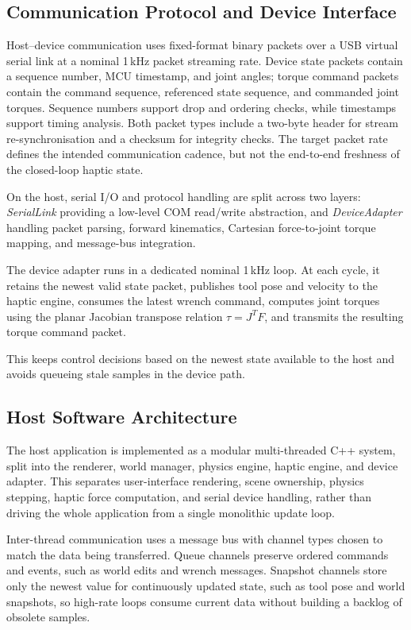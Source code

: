 \subsection{Communication Protocol and Device Interface}

Host--device communication uses fixed-format binary packets over a USB virtual serial link at a nominal 1\,kHz packet streaming rate. Device state packets contain a sequence number, MCU timestamp, and joint angles; torque command packets contain the command sequence, referenced state sequence, and commanded joint torques. Sequence numbers support drop and ordering checks, while timestamps support timing analysis. Both packet types include a two-byte header for stream re-synchronisation and a checksum for integrity checks. The target packet rate defines the intended communication cadence, but not the end-to-end freshness of the closed-loop haptic state.

On the host, serial I/O and protocol handling are split across two layers: \textit{SerialLink} providing a low-level COM read/write abstraction, and \textit{DeviceAdapter} handling packet parsing, forward kinematics, Cartesian force-to-joint torque mapping, and message-bus integration.

The device adapter runs in a dedicated nominal 1\,kHz loop. At each cycle, it retains the newest valid state packet, publishes tool pose and velocity to the haptic engine, consumes the latest wrench command, computes joint torques using the planar Jacobian transpose relation \(\tau = J^{T}F\), and transmits the resulting torque command packet.

This keeps control decisions based on the newest state available to the host and avoids queueing stale samples in the device path.

\subsection{Host Software Architecture}

The host application is implemented as a modular multi-threaded C++ system, split into the renderer, world manager, physics engine, haptic engine, and device adapter. This separates user-interface rendering, scene ownership, physics stepping, haptic force computation, and serial device handling, rather than driving the whole application from a single monolithic update loop.

Inter-thread communication uses a message bus with channel types chosen to match the data being transferred. Queue channels preserve ordered commands and events, such as world edits and wrench messages. Snapshot channels store only the newest value for continuously updated state, such as tool pose and world snapshots, so high-rate loops consume current data without building a backlog of obsolete samples.

